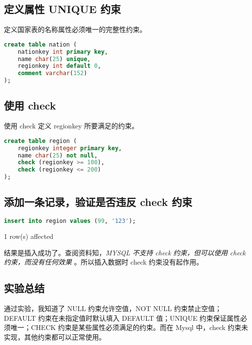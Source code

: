 \documentclass{article}
\begin{document}
\subsection{定义属性 UNIQUE 约束}

定义国家表的名称属性必须唯一的完整性约束。

\begin{lstlisting}[language=sql]
create table nation (
	nationkey int primary key,
    name char(25) unique,
    regionkey int default 0,
    comment varchar(152)
);
\end{lstlisting}

\subsection{使用 check}

使用 check 定义 regionkey 所要满足的约束。

\begin{lstlisting}[language=sql]
create table region (
	regionkey integer primary key,
    name char(25) not null,
    check (regionkey >= 100),
    check (regionkey <= 200)
);
\end{lstlisting}

\subsection{添加一条记录，验证是否违反 check 约束}

\begin{lstlisting}[language=sql]
insert into region values (99, '123');
\end{lstlisting}

1 row(s) affected

结果是插入成功了。查阅资料知，\emph{MYSQL 不支持 check 约束，但可以使用 check 约束，而没有任何效果} 。所以插入数据时 check 约束没有起作用。

\subsection{实验总结}

通过实验，我知道了 NULL 约束允许空值，NOT NULL 约束禁止空值；DEFAULT 约束在未指定值时默认填入 DEFAULT 值；UNIQUE 约束保证属性必须唯一；CHECK 约束是某些属性必须满足的约束。而在 Mysql 中，check 约束未实现，其他约束都可以正常使用。
\end{document}

